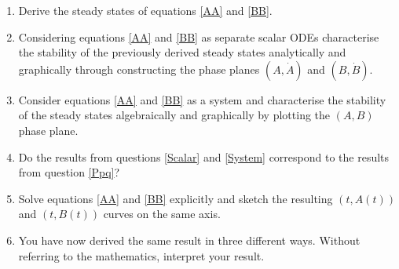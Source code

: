 \documentclass[10pt]{article}
\newcommand{\eqns}[2]{equations \eqref{#1} and \eqref{#2}}
\renewcommand{\l}{\left(}
\renewcommand{\r}{\right)}
\begin{document}
\begin{enumerate}
\item Derive the steady states of \eqns{AA}{BB}.

\item Considering \eqns{AA}{BB} as separate scalar ODEs characterise the stability of the previously derived steady states analytically and graphically through constructing the phase planes $\l A,\dot{A} \r$ and $\l B,\dot{B}\r$.\label{Scalar}

\item Consider \eqns{AA}{BB} as a system and characterise the stability of the steady states algebraically and graphically by plotting the $(A,B)$ phase plane.\label{System}

\item Do the results from questions \eqref{Scalar} and \eqref{System} correspond to the results from question \ref{Ppq}?

\item Solve \eqns{AA}{BB} explicitly and sketch the resulting $(t,A(t))$ and $(t,B(t))$ curves on the same axis.

\item You have now derived the same result in three different ways. Without referring to the mathematics, interpret your result.
\end{enumerate}
\end{document}
